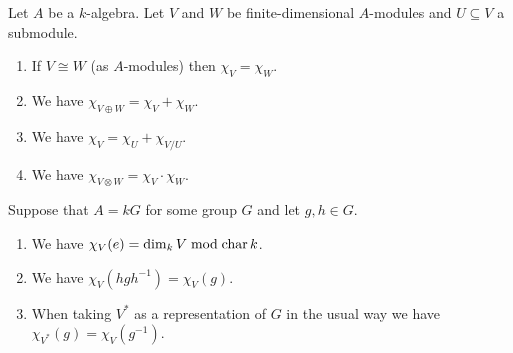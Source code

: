 \begin{prop}
 Let $A$ be a $k$-algebra. Let $V$ and $W$ be finite-dimensional $A$-modules and $U \subseteq V$ a submodule.
 \begin{enumerate}[label=\emph{\alph*})]
  \item
   If $V \cong W$ (as $A$-modules) then $\chi_V = \chi_W$.
  \item
   We have $\chi_{V \oplus W} = \chi_V + \chi_W$.
  \item
   We have $\chi_V = \chi_U + \chi_{V/U}$.
  \item
   We have $\chi_{V \otimes W} = \chi_V \cdot \chi_W$.
 \end{enumerate}
 Suppose that $A = kG$ for some group $G$ and let $g,h \in G$.
 \begin{enumerate}[label=\emph{\alph*}),resume]
  \item
   We have $\chi_V(e) = \dim_k V \bmod \operatorname{char} k$.
  \item
   We have $\chi_V(hgh^{-1}) = \chi_V(g)$.
  \item
   When taking $V^*$ as a representation of $G$ in the usual way we have $\chi_{V^*}(g) = \chi_V(g^{-1})$.
 \end{enumerate}
\end{prop}
